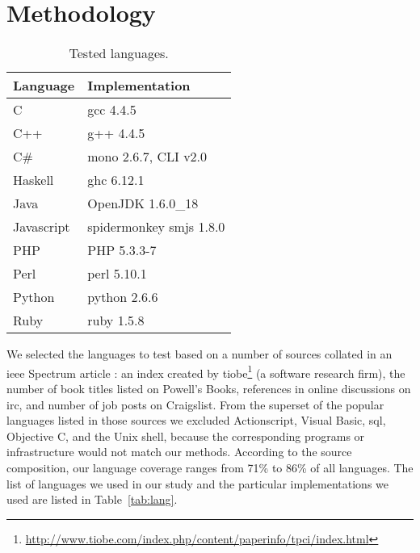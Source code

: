 \documentclass[10pt]{sigplanconf}
\begin{document}
\section{Methodology} %
\begin{table}
\begin{center}
\caption{Tested languages.}
\label{tab:langs}
\begin{tabular}{ l l}
 \hline
Language & Implementation \\
\hline
C 			& gcc 4.4.5 \\
C++ 		& g++ 4.4.5 \\
C\# 		& mono 2.6.7, CLI v2.0 \\
Haskell 	& ghc 6.12.1 \\
Java 		& OpenJDK 1.6.0\_18 \\
Javascript 	& spidermonkey smjs 1.8.0 \\
PHP 		& PHP 5.3.3-7 \\
Perl 		& perl 5.10.1 \\
Python 		& python 2.6.6 \\
Ruby 		& ruby 1.5.8 \\
\hline
\end{tabular}
\end{center}
\end{table}

We selected the languages to test based on a number of sources
collated in an {\sc ieee} Spectrum article \cite{Kin11}:
an index created by
{\sc tiobe}\footnote{\url{http://www.tiobe.com/index.php/content/paperinfo/tpci/index.html}} (a software research firm),
the number of book titles listed on Powell's Books,
references in online discussions on {\sc irc}, and
number of job posts on Craigslist.
From the superset of the popular languages listed in those
sources we excluded
Actionscript, Visual Basic, {\sc sql}, Objective C, and the Unix shell,
because the corresponding programs or infrastructure would not match our methods.
According to the source composition,
our language coverage ranges from 71\% to 86\% of all languages.
The list of languages we used in our study and the
particular implementations we used are listed in
Table~\ref{tab:lang}.
\end{document}
